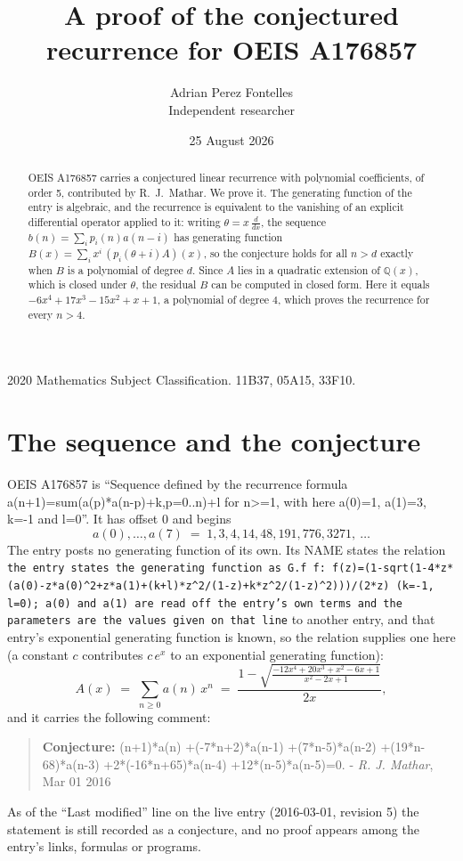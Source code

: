 \documentclass[11pt,a4paper]{article}
\title{A proof of the conjectured recurrence for OEIS A176857}
\author{Adrian Perez Fontelles\\ \small Independent researcher}
\date{25 August 2026}
\theoremstyle{plain}
\theoremstyle{definition}
\begin{document}
\maketitle

\begin{abstract}
OEIS A176857 carries a conjectured linear recurrence with polynomial coefficients, of
order 5, contributed by R.~J.~Mathar. We prove it. The generating function of the
entry is algebraic, and the recurrence is equivalent to the vanishing of an explicit
differential operator applied to it: writing $\theta=x\,\frac{d}{dx}$, the sequence
$b(n)=\sum_{i}p_{i}(n)a(n-i)$ has generating function
$B(x)=\sum_{i}x^{i}\,(p_{i}(\theta+i)A)(x)$, so the conjecture holds for all $n>d$ exactly
when $B$ is a polynomial of degree $d$. Since $A$ lies in a quadratic extension of
$\mathbb{Q}(x)$, which is closed under $\theta$, the residual $B$ can be computed in
closed form. Here it equals $- 6 x^{4} + 17 x^{3} - 15 x^{2} + x + 1$, a polynomial of degree $4$, which proves
the recurrence for every $n>4$.
\end{abstract}

\noindent\small 2020 Mathematics Subject Classification. 11B37, 05A15, 33F10.\normalsize

\section{The sequence and the conjecture}

OEIS A176857 is ``Sequence defined by the recurrence formula a(n+1)=sum(a(p)*a(n-p)+k,p=0..n)+l for n>=1, with here a(0)=1, a(1)=3, k=-1 and l=0''. It has offset $0$ and begins
\[
a(0),\dots,a(7)\;=\;1, 3, 4, 14, 48, 191, 776, 3271,\ \dots
\]
The entry posts no generating function of its own. Its NAME states the
relation \texttt{the entry states the generating function as G.f f: f(z)=(1-sqrt(1-4*z*(a(0)-z*a(0)\textasciicircum{}2+z*a(1)+(k+l)*z\textasciicircum{}2/(1-z)+k*z\textasciicircum{}2/(1-z)\textasciicircum{}2)))/(2*z) (k=-1, l=0); a(0) and a(1) are read off the entry's own terms and the parameters are the values given on that line} to another entry, and that entry's exponential generating
function is known, so the relation supplies one here (a constant $c$ contributes
$c\,e^{x}$ to an exponential generating function):
\begin{equation}\label{eq:gf}
A(x)\;=\;\sum_{n\ge 0} a(n)\,x^{n}\;=\;\frac{1 - \sqrt{\frac{- 12 x^{4} + 20 x^{3} + x^{2} - 6 x + 1}{x^{2} - 2 x + 1}}}{2 x} ,
\end{equation}
and it carries the following comment:
\begin{quote}\small
\textbf{Conjecture:} (n+1)*a(n) +(-7*n+2)*a(n-1) +(7*n-5)*a(n-2) +(19*n-68)*a(n-3) +2*(-16*n+65)*a(n-4) +12*(n-5)*a(n-5)=0. - \emph{R. J. Mathar}, Mar 01 2016
\end{quote}
As of the ``Last modified'' line on the live entry (2016-03-01, revision 5) the
statement is still recorded as a conjecture, and no proof appears among the entry's links,
formulas or programs.
\end{document}

